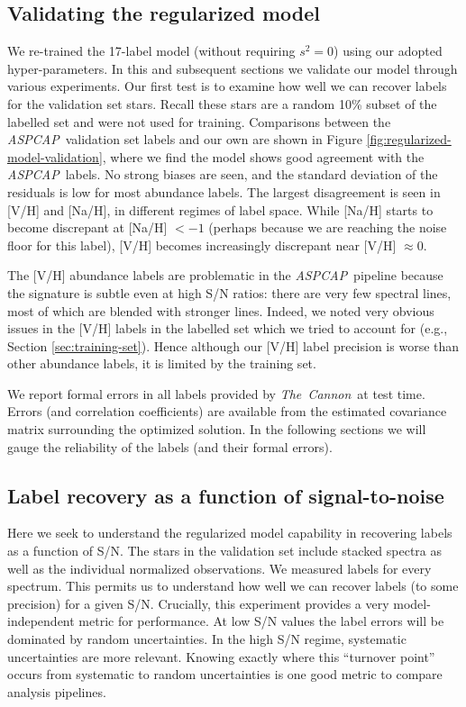 \documentclass[12pt,preprint]{aastex}
\newcommand{\project}[1]{\textsl{#1}}
\newcommand{\TheCannon}{\project{The~Cannon}}
\newcommand{\acronym}[1]{{\small{#1}}}
\newcommand{\aspcap}{\project{\acronym{ASPCAP}}}
\begin{document}
\subsection{Validating the regularized model}
\label{sec:model-validation}


We re-trained the 17-label model (without requiring $s^2 = 0$) using our adopted
hyper-parameters.  In this and subsequent sections we validate our model through
various experiments.  Our first test is to examine how well we can recover
labels for the validation set stars.  Recall these stars are a random 10\%
subset of the labelled set and were not used for training.  Comparisons between
the \aspcap\ validation set labels and our own are shown in Figure
\ref{fig:regularized-model-validation}, where we find the model shows good
agreement with the \aspcap\ labels.  No strong biases are seen, and the standard
deviation of the residuals is low for most abundance labels.  The largest
disagreement is seen in [V/H] and [Na/H], in different regimes of label space.
While [Na/H] starts to become discrepant at [Na/H] $< -1$ (perhaps because we
are reaching the noise floor for this label), [V/H] becomes increasingly discrepant
near [V/H] $\approx 0$. 


The [V/H] abundance labels are problematic in the \aspcap\ pipeline 
because the signature is subtle even at high S/N ratios: there are very few
spectral lines, most of which are blended with stronger lines.  Indeed, we noted
very obvious issues in the [V/H] labels in the labelled set which we tried to
account for (e.g., Section \ref{sec:training-set}).  Hence although our [V/H]
label precision is worse than other abundance labels, it is limited by the
training set.


We report formal errors in all labels provided by \TheCannon\ at test time.
Errors (and correlation coefficients) are available from the estimated
covariance matrix surrounding the optimized solution.  In the following sections
we will gauge the reliability of the labels (and their formal errors).


\subsection{Label recovery as a function of signal-to-noise}
\label{sec:label-recovery-snr}


Here we seek to understand the
regularized model capability in recovering labels as a function of S/N.  The 
stars in the validation set include stacked spectra as well as the individual 
normalized observations.  We measured labels for every spectrum.  This permits us
to understand how well we can recover labels (to some precision) for a given 
S/N.  Crucially, this experiment provides a very model-independent metric for
performance.  At low S/N values the label errors will be dominated by random
uncertainties.  In the high S/N regime, systematic uncertainties are more 
relevant.  Knowing exactly where this ``turnover point'' occurs from systematic
to random uncertainties is one good metric to compare analysis pipelines.
\end{document}
